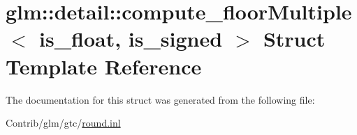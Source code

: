\hypertarget{structglm_1_1detail_1_1compute__floor_multiple}{}\section{glm\+:\+:detail\+:\+:compute\+\_\+floor\+Multiple$<$ is\+\_\+float, is\+\_\+signed $>$ Struct Template Reference}
\label{structglm_1_1detail_1_1compute__floor_multiple}


The documentation for this struct was generated from the following file\+:\begin{DoxyCompactItemize}
\item 
Contrib/glm/gtc/\mbox{\hyperlink{round_8inl}{round.\+inl}}\end{DoxyCompactItemize}
